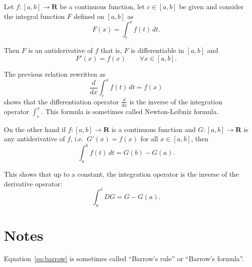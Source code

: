 \documentclass[12pt]{article}
\begin{document}
Let $f\colon[a,b]\to \mathbf R$ be a continuous function, let $c\in[a,b]$ be given 
and consider the integral function $F$ defined on $[a,b]$ as
\[
  F(x)= \int_c^x f(t)\, dt.
\]

Then $F$ is an antiderivative of $f$ that is, 
$F$ is differentiable in $[a,b]$ and
\[
  F'(x)=f(x)\qquad \forall x\in [a,b].
\]


The previous relation rewritten as
\[
   \frac{d}{dx} \int_c^x f(t)\, dt = f(x)  
\]
shows that the differentiation operator $\frac{d}{dx}$ is the inverse of the integration operator $\int_c^x$. This formula is sometimes called Newton-Leibniz formula.

On the other hand if $f\colon[a,b]\to \mathbf R$ is a continuous function 
and $G\colon[a,b]\to \mathbf R$ is any antiderivative of $f$, i.e.\ $G'(x)=f(x)$ for all $x\in[a,b]$, then
\begin{equation}\label{eq:barrow}
  \int_a^b f(t) \, dt = G(b)-G(a). 
\end{equation}

This shows that up to a constant, the integration operator is the inverse of the derivative operator:
\[
  \int_a^x D G = G - G(a).
\]

\section*{Notes}
Equation~\eqref{eq:barrow} is sometimes called ``Barrow's rule'' or ``Barrow's formula''.
\end{document}
